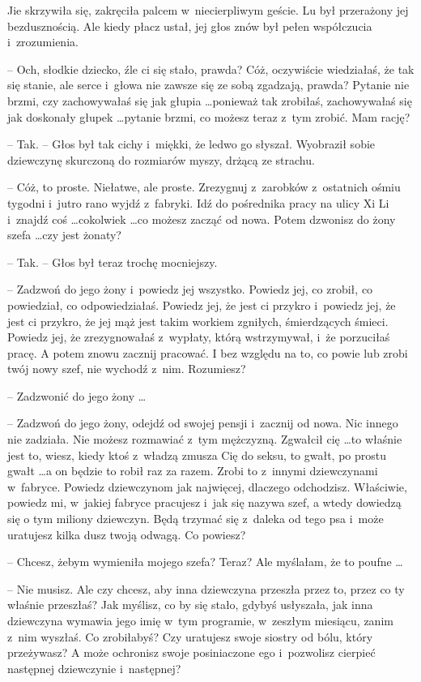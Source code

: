 \documentclass[oneside,polish,11pt,rmheadings]{mwbk}
\begin{document}
Jie skrzywiła się, zakręciła palcem w~niecierpliwym geście. Lu był przerażony jej bezdusznością. Ale kiedy płacz ustał, jej głos znów był pełen współczucia i~zrozumienia.

-- Och, słodkie dziecko, źle ci się stało, prawda? Cóż, oczywiście wiedziałaś, że tak się stanie, ale serce i~głowa nie zawsze się ze sobą zgadzają, prawda? Pytanie nie brzmi, czy zachowywałaś się jak głupia  \ldots  ponieważ tak zrobiłaś, zachowywałaś się jak doskonały głupek  \ldots  pytanie brzmi, co możesz teraz z~tym zrobić. Mam rację?

-- Tak. -- Głos był tak cichy i~miękki, że ledwo go słyszał. Wyobraził sobie dziewczynę skurczoną do rozmiarów myszy, drżącą ze strachu.

-- Cóż, to proste. Niełatwe, ale proste. Zrezygnuj z~zarobków z~ostatnich ośmiu tygodni i~jutro rano wyjdź z~fabryki. Idź do pośrednika pracy na ulicy Xi Li i~znajdź coś  \ldots  cokolwiek  \ldots  co możesz zacząć od nowa. Potem dzwonisz do żony szefa  \ldots  czy jest żonaty?

-- Tak. -- Głos był teraz trochę mocniejszy.

-- Zadzwoń do jego żony i~powiedz jej wszystko. Powiedz jej, co zrobił, co powiedział, co odpowiedziałaś. Powiedz jej, że jest ci przykro i~powiedz jej, że jest ci przykro, że jej mąż jest takim workiem zgniłych, śmierdzących śmieci. Powiedz jej, że zrezygnowałaś z~wypłaty, którą wstrzymywał, i~że porzuciłaś pracę. A potem znowu zacznij pracować. I bez względu na to, co powie lub zrobi twój nowy szef, nie wychodź z~nim. Rozumiesz? 

-- Zadzwonić do jego żony \ldots  

-- Zadzwoń do jego żony, odejdź od swojej pensji i~zacznij od nowa. Nic innego nie zadziała. Nie możesz rozmawiać z~tym mężczyzną. Zgwałcił cię \ldots  to właśnie jest to, wiesz, kiedy ktoś z~władzą zmusza Cię do seksu, to gwałt, po prostu gwałt  \ldots  a on będzie to robił raz za razem. Zrobi to z~innymi dziewczynami w~fabryce. Powiedz dziewczynom jak najwięcej, dlaczego odchodzisz. Właściwie, powiedz mi, w~jakiej fabryce pracujesz i~jak się nazywa szef, a wtedy dowiedzą się o tym miliony dziewczyn. Będą trzymać się z~daleka od tego psa i~może uratujesz kilka dusz twoją odwagą. Co powiesz?

-- Chcesz, żebym wymieniła mojego szefa? Teraz? Ale myślałam, że to poufne \ldots 

-- Nie musisz. Ale czy chcesz, aby inna dziewczyna przeszła przez to, przez co ty właśnie przeszłaś? Jak myślisz, co by się stało, gdybyś usłyszała, jak inna dziewczyna wymawia jego imię w~tym programie, w~zeszłym miesiącu, zanim z~nim wyszłaś. Co zrobiłabyś? Czy uratujesz swoje siostry od bólu, który przeżywasz? A może ochronisz swoje posiniaczone ego i~pozwolisz cierpieć następnej dziewczynie i~następnej? 
\end{document}
